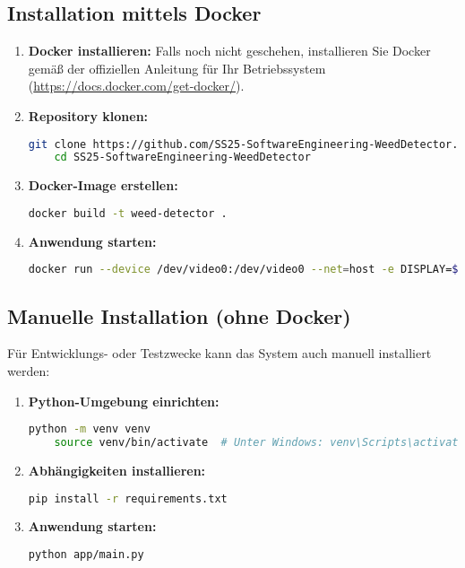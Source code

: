 \documentclass[12pt, a4paper]{scrreprt}
\begin{document}
\subsection{Installation mittels Docker}
\begin{enumerate}
    \item \textbf{Docker installieren:} Falls noch nicht geschehen, installieren Sie Docker gemäß der offiziellen Anleitung für Ihr Betriebssystem (\url{https://docs.docker.com/get-docker/}).
    
    \item \textbf{Repository klonen:}
    \begin{lstlisting}[language=bash]
    git clone https://github.com/SS25-SoftwareEngineering-WeedDetector.git
    cd SS25-SoftwareEngineering-WeedDetector
    \end{lstlisting}
    
    \item \textbf{Docker-Image erstellen:}
    \begin{lstlisting}[language=bash]
    docker build -t weed-detector .
    \end{lstlisting}
    
    \item \textbf{Anwendung starten:}
    \begin{lstlisting}[language=bash]
    docker run --device /dev/video0:/dev/video0 --net=host -e DISPLAY=$DISPLAY -v /tmp/.X11-unix:/tmp/.X11-unix weed-detector
    \end{lstlisting}
\end{enumerate}

\subsection{Manuelle Installation (ohne Docker)}
Für Entwicklungs- oder Testzwecke kann das System auch manuell installiert werden:

\begin{enumerate}
    \item \textbf{Python-Umgebung einrichten:}
    \begin{lstlisting}[language=bash]
    python -m venv venv
    source venv/bin/activate  # Unter Windows: venv\Scripts\activate
    \end{lstlisting}
    
    \item \textbf{Abhängigkeiten installieren:}
    \begin{lstlisting}[language=bash]
    pip install -r requirements.txt
    \end{lstlisting}
    
    \item \textbf{Anwendung starten:}
    \begin{lstlisting}[language=bash]
    python app/main.py
    \end{lstlisting}
\end{enumerate}
\end{document}
